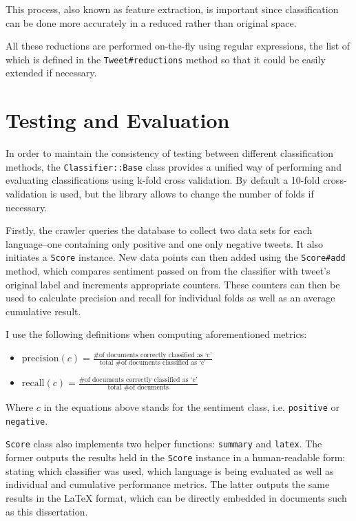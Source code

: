 This process, also known as feature extraction, is important since classification can be done more accurately in a reduced rather than original space.

All these reductions are performed on-the-fly using regular expressions, the list of which is defined in the \verb|Tweet#reductions| method so that it could be easily extended if necessary.

\section{Testing and Evaluation}

In order to maintain the consistency of testing between different classification methods, the \verb|Classifier::Base| class provides a unified way of performing and evaluating classifications using k-fold cross validation. By default a 10-fold cross-validation is used, but the library allows to change the number of folds if necessary.

Firstly, the crawler queries the database to collect two data sets for each language--one containing only positive and one only negative tweets. It also initiates a \verb|Score| instance. New data points can then added using the \verb|Score#add| method, which compares sentiment passed on from the classifier with tweet's original label and increments appropriate counters. These counters can then be used to calculate precision and recall for individual folds as well as an average cumulative result.

I use the following definitions when computing aforementioned metrics:

\begin{itemize}
  \item $\textrm{precision}(c) = \frac{\textrm{\# of documents correctly classified as `c'}}{\textrm{total \# of documents classified as `c'}}$
  \item $\textrm{recall}(c) = \frac{\textrm{\# of documents correctly classified as `c'}}{\textrm{total \# of documents}}$
\end{itemize}

Where $c$ in the equations above stands for the sentiment class, i.e. \verb|positive| or \verb|negative|.

\verb|Score| class also implements two helper functions: \verb|summary| and \verb|latex|. The former outputs the results held in the \verb|Score| instance in a human-readable form: stating which classifier was used, which language is being evaluated as well as individual and cumulative performance metrics. The latter outputs the same results in the {\LaTeX} format, which can be directly embedded in documents such as this dissertation.

